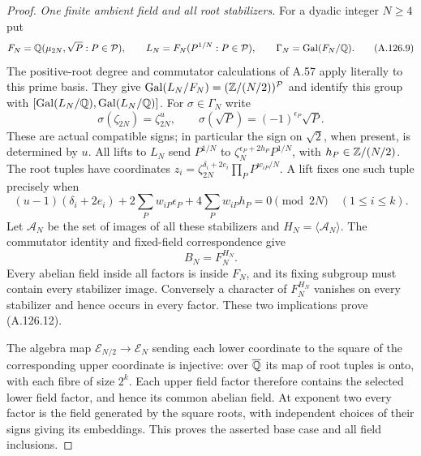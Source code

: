 \begin{proof}
\emph{One finite ambient field and all root stabilizers.}
For a dyadic integer $N\ge4$ put
\[
 F_N=\mathbb Q(\mu_{2N},\sqrt P:P\in\mathcal P),\qquad
 L_N=F_N(P^{1/N}:P\in\mathcal P),\qquad
 \Gamma_N=\operatorname{Gal}(F_N/\mathbb Q).
\tag{A.126.9}
\]
The positive-root degree and commutator calculations of
A.57 apply literally to this prime basis.  They give
$\operatorname{Gal}(L_N/F_N)=(\mathbb Z/(N/2))^{\mathcal P}$
and identify this group with
$[\operatorname{Gal}(L_N/\mathbb Q),\operatorname{Gal}(L_N/\mathbb Q)]$.
For $\sigma\in\Gamma_N$ write
\[
 \sigma(\zeta_{2N})=\zeta_{2N}^{u},\qquad
 \sigma(\sqrt P)=(-1)^{\epsilon_P}\sqrt P.
\tag{A.126.10}
\]
These are actual compatible signs; in particular the
sign on $\sqrt2$, when present, is determined by $u$.
All lifts to $L_N$ send
$P^{1/N}$ to $\zeta_N^{\epsilon_P+2h_P}P^{1/N}$,
with $h_P\in\mathbb Z/(N/2)$.
The root tuples have coordinates
$z_i=\zeta_{2N}^{\delta_i+2e_i}\prod_P P^{w_{iP}/N}$.
A lift fixes one such tuple precisely when
\[
 (u-1)(\delta_i+2e_i)+2\sum_Pw_{iP}\epsilon_P
              +4\sum_Pw_{iP}h_P=0\pmod{2N}
                                      \quad(1\le i\le k).
\tag{A.126.11}
\]
Let $\mathcal A_N$ be the set of images of all these
stabilizers and $H_N=\langle\mathcal A_N\rangle$.
The commutator identity and fixed-field correspondence give
\[
                              B_N=F_N^{H_N}.
\tag{A.126.12}
\]
Every abelian field inside all factors is inside $F_N$,
and its fixing subgroup must contain every stabilizer
image.  Conversely a character of $F_N^{H_N}$ vanishes
on every stabilizer and hence occurs in every factor.
These two implications prove (A.126.12).

The algebra map $\mathcal E_{N/2}\to\mathcal E_N$
sending each lower coordinate to the square of the
corresponding upper coordinate is injective: over
$\overline{\mathbb Q}$ its map of root tuples is onto, with
each fibre of size $2^k$.
Each upper field factor therefore contains the selected
lower field factor, and hence its common abelian field.
At exponent two every factor is the field generated
by the square roots, with independent choices of their
signs giving its embeddings.  This proves the asserted
base case and all field inclusions.


\end{proof}
